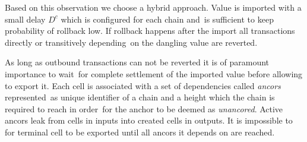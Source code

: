 Based on this observation we choose a hybrid approach.
Value is imported with a small delay $D^c$ which is configured for each chain and\
is sufficient to keep probability of rollback low.
If rollback happens after the import all transactions directly or transitively depending\
on the dangling value are reverted.

As long as outbound transactions can not be reverted it is of paramount importance to wait\
for complete settlement of the imported value before allowing to export it.
Each cell is associated with a set of dependencies called \emph{ancors} represented\
as unique identifier of a chain and a height which the chain is required to reach in order\
for the anchor to be deemed as \emph{unancored}.
Active ancors leak from cells in inputs into created cells in outputs.
It is impossible to for terminal cell to be exported until all ancors it depends on are reached.
